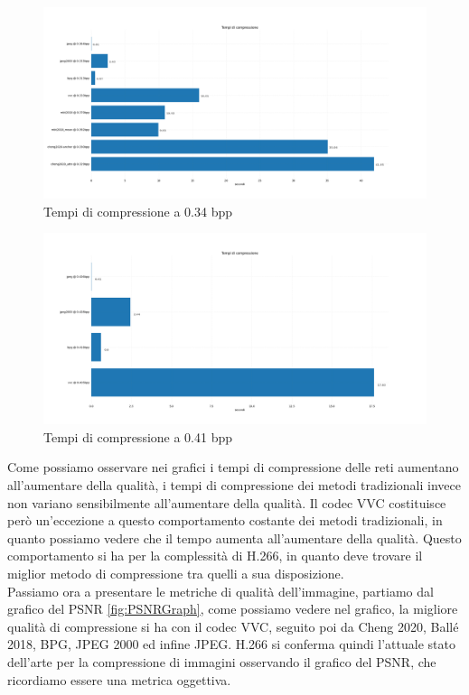 \newpage
\begin{figure}[!h]
    \centering
    \includegraphics[width=1\textwidth]{Immagini/METRICS/times@0.34bpp.png}
    \caption{Tempi di compressione a 0.34 bpp}
    \label{fig:times34}
\end{figure}
\hspace{0.5cm}
\begin{figure}[!h]
    \centering
    \includegraphics[width=1\textwidth]{Immagini/METRICS/times@0.41bpp.png}
    \caption{Tempi di compressione a 0.41 bpp}
    \label{fig:times41}
\end{figure}
\clearpage 
Come possiamo osservare nei grafici i tempi di compressione delle reti aumentano all’aumentare della qualità, i tempi di compressione dei metodi tradizionali invece non variano sensibilmente all’aumentare della qualità. Il codec VVC costituisce però un’eccezione a questo comportamento costante dei metodi tradizionali, in quanto possiamo vedere che il tempo aumenta all’aumentare della qualità. Questo comportamento si ha per la complessità di H.266, in quanto deve trovare il miglior metodo di compressione tra quelli a sua disposizione.\\
Passiamo ora a presentare le metriche di qualità dell’immagine, partiamo dal grafico del PSNR \ref{fig:PSNRGraph}, come possiamo vedere nel grafico, la migliore qualità di compressione si ha con il codec VVC, seguito poi da Cheng 2020, Ballé 2018, BPG, JPEG 2000 ed infine JPEG. H.266 si conferma quindi l’attuale stato dell’arte per la compressione di immagini osservando il grafico del PSNR, che ricordiamo essere una metrica oggettiva.\\
